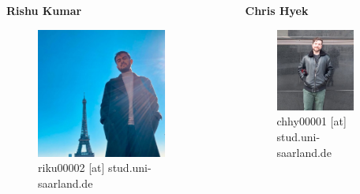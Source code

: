 \documentclass[aspectratio=169]{beamer}
\begin{document}
\begin{frame}{}
\begin{center}
\begin{columns}[T]
    \begin{column}{0.3\textwidth}
    \begin{center}
    \textbf{Rishu Kumar}
    \begin{figure}
        \includegraphics[width=0.8\textwidth, height=0.8\textwidth]{Images/rishu_photo.jpg}
        \caption{riku00002 [at] stud.uni-saarland.de}
        \label{fig:cockroach}
    \end{figure}
    \end{center}
    \end{column}

        \begin{column}{0.3\textwidth}
    \begin{center}
    \textbf{Chris Hyek}
    \begin{figure}
        \includegraphics[width=0.8\textwidth, height=0.8\textwidth]{Images/chris_photo.jpg}
        \caption{chhy00001 [at] stud.uni-saarland.de}
        \label{fig:cockroach}
    \end{figure}
    \end{center}
    \end{column}
    

\end{columns}
\end{center}
\end{frame}
\end{document}
